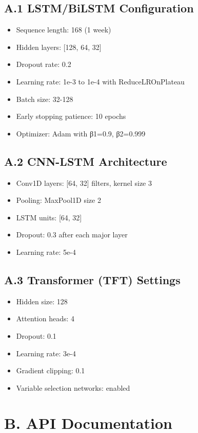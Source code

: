 \documentclass[12pt,a4paper]{report}
\begin{document}
\subsection*{A.1 LSTM/BiLSTM Configuration}
\begin{itemize}
\item Sequence length: 168 (1 week)
\item Hidden layers: [128, 64, 32]
\item Dropout rate: 0.2
\item Learning rate: 1e-3 to 1e-4 with ReduceLROnPlateau
\item Batch size: 32-128
\item Early stopping patience: 10 epochs
\item Optimizer: Adam with β1=0.9, β2=0.999
\end{itemize}

\subsection*{A.2 CNN-LSTM Architecture}
\begin{itemize}
\item Conv1D layers: [64, 32] filters, kernel size 3
\item Pooling: MaxPool1D size 2
\item LSTM units: [64, 32]
\item Dropout: 0.3 after each major layer
\item Learning rate: 5e-4
\end{itemize}

\subsection*{A.3 Transformer (TFT) Settings}
\begin{itemize}
\item Hidden size: 128
\item Attention heads: 4
\item Dropout: 0.1
\item Learning rate: 3e-4
\item Gradient clipping: 0.1
\item Variable selection networks: enabled
\end{itemize}

\section*{B. API Documentation}
\end{document}
